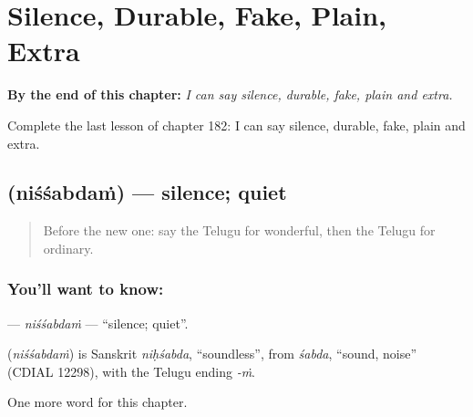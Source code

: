 
\chapter{Silence, Durable, Fake, Plain, Extra}
\label{ch:te-silence-durable-fake-plain-extra}

\begin{chapteropening}
\textbf{By the end of this chapter:} \emph{I can say silence, durable, fake, plain and extra.}

Complete the last lesson of chapter 182: I can say silence, durable, fake, plain and extra.
\end{chapteropening}

\section[\texorpdfstring{\te{నిశ్శబ్దం} (niśśabdaṁ)}{నిశ్శబ్దం (niśśabdaṁ)}]{ (niśśabdaṁ) — silence; quiet}

\label{lesson:TE-C182-nissabdam}



\begin{quote}
Before the new one: say the Telugu for wonderful, then the Telugu for ordinary.
\end{quote}

\subsection*{You'll want to know: }
\textbf{} — \emph{niśśabdaṁ} — \textquotedblleft{}silence; quiet\textquotedblright{}.

\begin{cousinweb}
\textbf{} (\emph{niśśabdaṁ}) is Sanskrit \emph{niḥśabda}, \textquotedblleft{}soundless\textquotedblright{}, from \emph{śabda}, \textquotedblleft{}sound, noise\textquotedblright{} (CDIAL 12298), with the Telugu ending \emph{-ṁ}.
\end{cousinweb}

\begin{grammarlens}[title={What you've built}]
One more word for this chapter.
\end{grammarlens}


